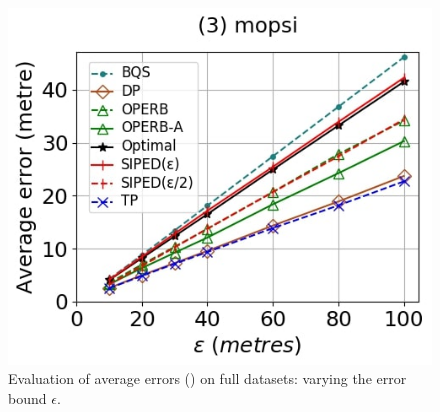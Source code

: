 \begin{figure}[tb!]
	\includegraphics[scale=0.250]{Figures/Exp-PED-error-epsilon-mopsi.jpg}	
	\vspace{-2ex}
	\caption{\small Evaluation of average errors (\ped) on full datasets: varying the error bound $\epsilon$.}
	\label{fig:ae-ped-epsilon}
	\vspace{-2ex}
\end{figure}

